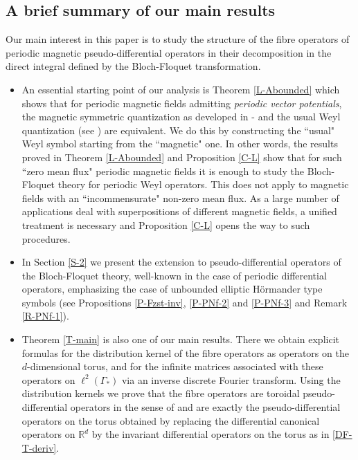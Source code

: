 \documentclass[12pt]{article}
\theoremstyle{definition}
\def\Rd{\mathbb{R}^d}
\numberwithin{equation}{section}
\begin{document}
\subsection{A brief summary of our main results}
	
Our main interest in this paper is to study the structure of the fibre operators of periodic magnetic pseudo-differential operators in their decomposition in the direct integral defined by the Bloch-Floquet transformation. 
\begin{itemize}
\item An essential starting point of our analysis is Theorem  \ref{L-Abounded} which shows that for periodic magnetic fields admitting {\it periodic vector potentials}, the magnetic symmetric quantization as developed in \cite{MP-1,IMP-1}-\cite{IMP-3} and the usual Weyl quantization (see \cite{Ho-3}) are equivalent. We do this by constructing the ``usual" Weyl symbol starting from the ``magnetic" one. 
In other words, the results proved in Theorem \ref{L-Abounded} and Proposition \ref{C-L} show that for such ``zero mean flux" periodic magnetic fields it is enough to study the Bloch-Floquet theory for periodic Weyl operators. This does not apply to magnetic fields with an ``incommensurate" non-zero mean flux. As a large number of applications deal with superpositions of different magnetic fields, a unified treatment is necessary and  Proposition \ref{C-L} opens the way to such procedures. 

\item In Section \ref{S-2} we present the extension to pseudo-differential operators of the Bloch-Floquet theory, well-known in the case of periodic differential operators, emphasizing the case of unbounded elliptic H\"{o}rmander type symbols (see Propositions \ref{P-Fzst-inv}, \ref{P-PNf-2} and \ref{P-PNf-3} and Remark \ref{R-PNf-1}).

\item Theorem \ref{T-main} is also one of our main results. There we obtain explicit formulas for the distribution kernel of the fibre operators as operators on the $d$-dimensional torus, and for the infinite matrices associated with  these operators on $\ell^2(\Gamma_*)$ via an inverse discrete Fourier transform. Using the distribution kernels we prove that the fibre operators are toroidal pseudo-differential operators in the sense of \cite{RT-06, RT-10, McL-91} and are exactly the pseudo-differential operators on the torus obtained by replacing the differential canonical operators on $\Rd$ by the invariant differential operators on the torus as in \eqref{DF-T-deriv}. 


\end{itemize}
\end{document}
